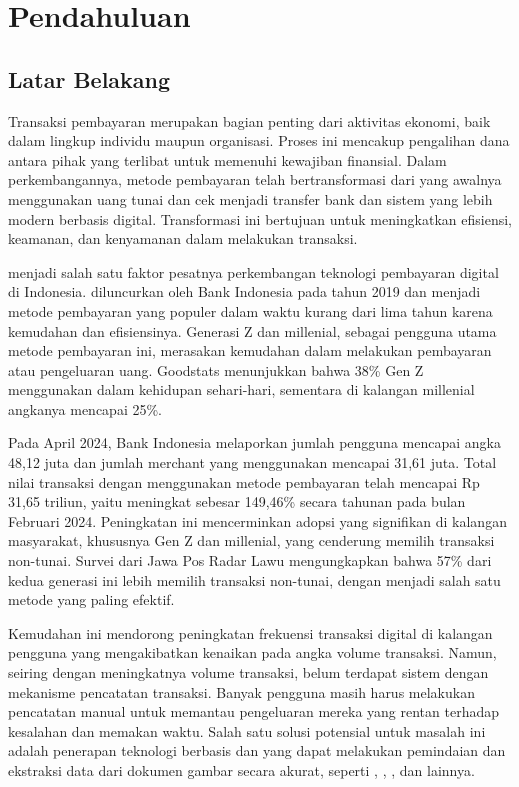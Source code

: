 \chapter{Pendahuluan}
\label{chapter:pendahuluan}

\section{Latar Belakang}
\label{sec:latarbelakang}

Transaksi pembayaran merupakan bagian penting dari aktivitas ekonomi, baik dalam lingkup individu maupun organisasi. Proses ini mencakup pengalihan dana antara pihak yang terlibat untuk memenuhi kewajiban finansial. Dalam perkembangannya, metode pembayaran telah bertransformasi dari yang awalnya menggunakan uang tunai dan cek menjadi transfer bank dan sistem yang lebih modern berbasis digital. Transformasi ini bertujuan untuk meningkatkan efisiensi, keamanan, dan kenyamanan dalam melakukan transaksi.

\qrisfull{} menjadi salah satu faktor pesatnya perkembangan teknologi pembayaran digital di Indonesia. \qris{} diluncurkan oleh Bank Indonesia pada tahun 2019 dan menjadi metode pembayaran yang populer dalam waktu kurang dari lima tahun karena kemudahan dan efisiensinya. Generasi Z dan millenial, sebagai pengguna utama metode pembayaran ini, merasakan kemudahan dalam melakukan pembayaran atau pengeluaran uang. Goodstats menunjukkan bahwa 38\% Gen Z menggunakan \qris{} dalam kehidupan sehari-hari, sementara di kalangan millenial angkanya mencapai
25\%.

Pada April 2024, Bank Indonesia melaporkan jumlah pengguna \qris{} mencapai angka 48,12 juta dan jumlah merchant yang menggunakan mencapai 31,61 juta. Total nilai transaksi dengan menggunakan metode pembayaran \qris{} telah mencapai Rp 31,65 triliun, yaitu meningkat sebesar 149,46\% secara tahunan
pada bulan Februari 2024. Peningkatan ini mencerminkan adopsi yang signifikan di kalangan masyarakat, khususnya Gen Z dan millenial, yang cenderung memilih
transaksi non-tunai. Survei dari Jawa Pos Radar Lawu mengungkapkan bahwa 57\% dari kedua generasi ini lebih memilih transaksi non-tunai, dengan \qris{} menjadi salah satu metode yang paling efektif.

\newpage

Kemudahan ini mendorong peningkatan frekuensi transaksi digital di kalangan pengguna yang mengakibatkan kenaikan pada angka volume transaksi. Namun, seiring dengan meningkatnya volume transaksi, belum terdapat sistem dengan mekanisme pencatatan transaksi. Banyak pengguna masih harus melakukan pencatatan manual untuk memantau pengeluaran mereka yang rentan terhadap kesalahan dan memakan waktu. Salah satu solusi potensial untuk masalah ini adalah penerapan teknologi berbasis \cvfull{} dan \dl{} yang dapat melakukan pemindaian dan ekstraksi data dari dokumen gambar secara akurat, seperti \ocrfull, \cnnfull, \transformer, dan lainnya.

